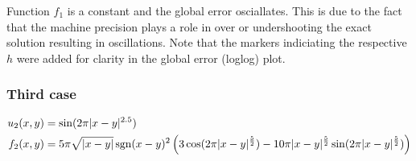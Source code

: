 \documentclass[main.tex]{subfiles}
\begin{document}
Function $f_1$ is a constant and the global error osciallates. This is due to the fact that the machine precision plays a role in over or undershooting the exact solution resulting in oscillations. Note that the markers indiciating the respective $h$ were added for clarity in the global error (loglog) plot.

\subsubsection*{Third case}
\begin{align}
    u_{2}(x,y) &= \sin(2 \pi |x-y|^{2.5}) \\
    f_2(x,y) &= 5 \pi \sqrt{|x-y|} \operatorname{sgn}(x-y)^2 \left(3 \cos(2 \pi |x-y|^{\frac{5}{2}}) - 10 \pi |x-y|^{\frac{5}{2}} \sin(2 \pi |x-y|^{\frac{5}{2}}) \right)
\end{align}
\end{document}
